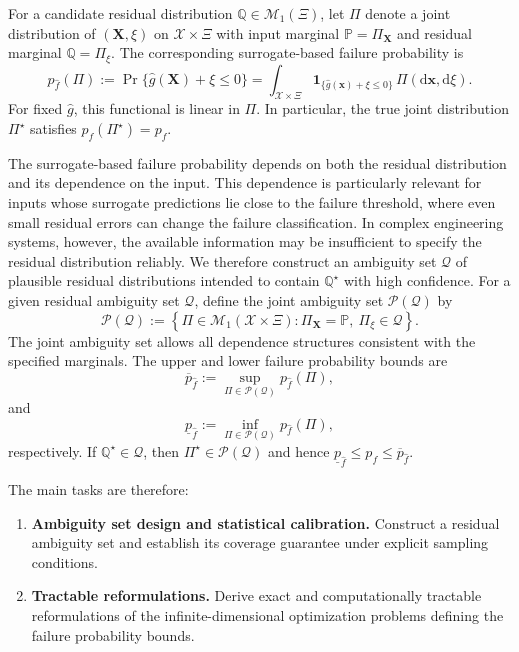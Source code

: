 \documentclass[review,11pt,3p,authoryear,nopreprintline]{elsarticle}
\begin{document}
For a candidate residual distribution $\mathbb Q\in\mathcal M_1(\Xi)$, let $\Pi$ denote a joint distribution of $(\bm X,\xi)$ on $\mathcal X\times\Xi$ with input marginal $\mathbb P = \Pi_{\bm X}$ and residual marginal $\mathbb Q = \Pi_{\xi}$. The corresponding surrogate-based failure probability is
\begin{equation}
  p_{\hat f}(\Pi):=\Pr\{\hat g(\bm X)+\xi\le0\}=\int_{\mathcal X\times\Xi}\mathbf 1_{\{\hat g(\bm x)+\xi\le0\}}\,\Pi(\mathrm d\bm x,\mathrm d\xi).
  \label{eq-surrogate-failure-probability}
\end{equation}
For fixed $\hat g$, this functional is linear in $\Pi$. In particular, the true joint distribution $\Pi^\star$ satisfies $p_{\hat f}(\Pi^\star)=p_f$.

The surrogate-based failure probability depends on both the residual distribution and its dependence on the input. This dependence is particularly relevant for inputs whose surrogate predictions lie close to the failure threshold, where even small residual errors can change the failure classification. In complex engineering systems, however, the available information may be insufficient to specify the residual distribution reliably. We therefore construct an ambiguity set $\mathcal Q$ of plausible residual distributions intended to contain $\mathbb Q^\star$ with high confidence. For a given residual ambiguity set $\mathcal Q$, define the joint ambiguity set $\mathcal P(\mathcal Q)$ by
\[
  \mathcal P(\mathcal Q) :=\left\{\Pi\in\mathcal M_1(\mathcal X\times\Xi):\Pi_{\bm X}=\mathbb P,\ \Pi_\xi\in\mathcal Q\right\}.
\]
The joint ambiguity set allows all dependence structures consistent with the specified marginals. The upper and lower failure probability bounds are
\begin{equation}
  \overline p_{\hat f}:=\sup_{\Pi\in\mathcal P(\mathcal Q)}p_{\hat f}(\Pi),
  \label{eq-upper-bound}
\end{equation}
and
\begin{equation}
  \underline p_{\hat f}:=\inf_{\Pi\in\mathcal P(\mathcal Q)}p_{\hat f}(\Pi),
  \label{eq-lower-bound}
\end{equation}
respectively. If $\mathbb Q^\star\in\mathcal Q$, then $\Pi^\star\in\mathcal P(\mathcal Q)$ and hence $\underline p_{\hat f}\le p_f\le\overline p_{\hat f}$.

The main tasks are therefore:
\begin{enumerate}
  \item \textbf{Ambiguity set design and statistical calibration.} Construct a residual ambiguity set and establish its coverage guarantee under explicit sampling conditions.
  \item \textbf{Tractable reformulations.} Derive exact and computationally tractable reformulations of the infinite-dimensional optimization problems defining the failure probability bounds.
\end{enumerate}
\end{document}
